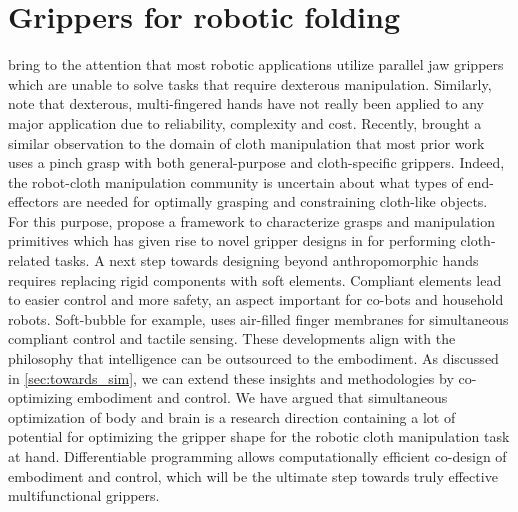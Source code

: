 \documentclass[\home/main.tex]{subfiles}
\begin{document}
\section{Grippers for robotic folding}
\Textcite{Billard2019} bring to the attention that most robotic applications utilize parallel jaw grippers which are unable to solve tasks that require dexterous manipulation.
Similarly, \textcite{Siciliano2008} note that dexterous, multi-fingered hands have not really been applied to any major application due to reliability, complexity and cost. Recently, \textcite{Borras2020} brought a similar observation to the domain of cloth manipulation that most prior work uses a pinch grasp with both general-purpose and cloth-specific grippers. Indeed, the robot-cloth manipulation community is uncertain about what types of end-effectors are needed for optimally grasping and constraining cloth-like objects. For this purpose, \citeauthor{Borras2020} propose a framework to characterize grasps and manipulation primitives which has given rise to novel gripper designs in \autocite{Donaire2020} for performing cloth-related tasks. 
A next step towards designing beyond anthropomorphic hands requires replacing rigid components with soft elements. Compliant elements lead to easier control and more safety, an aspect important for co-bots and household robots. Soft-bubble \autocite{Naveen2020soft} for example, uses air-filled finger membranes for simultaneous compliant control and tactile sensing.
These developments align with the philosophy that intelligence can be outsourced to the embodiment.
As discussed in \cref{sec:towards_sim}, we can extend these insights and methodologies by co-optimizing embodiment and control. We have argued that simultaneous optimization of body and brain is a research direction containing a lot of potential for optimizing the gripper shape for the robotic cloth manipulation task at hand. Differentiable programming allows computationally efficient co-design of embodiment and control, which will be the ultimate step towards truly effective multifunctional grippers.


\end{document}
